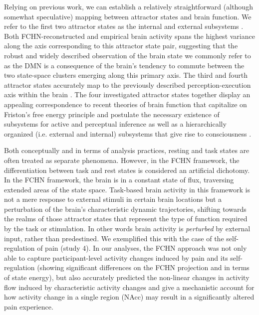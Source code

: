 \documentclass{article}
\begin{document}
Relying on previous work, we can establish a relatively straightforward (although somewhat speculative) mapping between attractor states and brain function. We refer to the first two attractor states as the internal and external subsystems \citep{golland2008data, cioli2014differences}. Both FCHN-reconstructed and empirical brain activity spans the highest variance along the axis corresponding to this attractor state pair, suggesting that the robust and widely described observation of the brain state we commonly refer to as the DMN is a consequence of the brain's tendency to commute between the two state-space clusters emerging along this primary axis.
The third and fourth attractor states accurately map to the previously described perception-execution axis within the brain \citep{fuster2004upper}. The four investigated attractor states together display an appealing correspondence to recent theories of brain function that capitalize on Friston's free energy principle \citep{friston2006free} and postulate the necessary existence of subsystems for active and perceptual inference \citep{friston2023free} as well as a hierarchically organized (i.e. external and internal) subsystems that give rise to consciousness \citep{ramstead2023inner}.

Both conceptually and in terms of analysis practices, resting and task states are often treated as separate phenomena. However, in the FCHN framework, the differentiation between task and rest states is considered an artificial dichotomy.
In the FCHN framework, the brain is in a constant state of flux, traversing extended areas of the state space. Task-based brain activity in this framework is not a mere response to external stimuli in certain brain locations but a perturbation of the brain's characteristic dynamic trajectories, shifting towards the realms of those attractor states that represent the type of function required by the task or stimulation. In other words brain activity is \textit{perturbed} by external input, rather than predestined. We exemplified this with the case of the self-regulation of pain (study 4).
In our analyses, the FCHN approach was not only able to capture participant-level activity changes induced by pain and its self-regulation (showing significant differences on the FCHN projection and in terms of state energy), but also accurately predicted the non-linear changes in activity flow induced by characteristic activity changes and give a mechanistic account for how activity change in a single region (NAcc) may result in a significantly altered pain experience.
\end{document}
